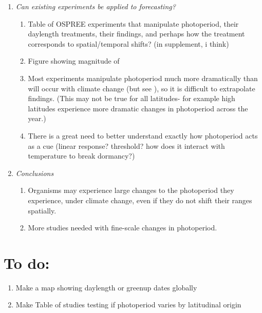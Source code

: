 \documentclass{article}
\begin{document}
\begin{enumerate}
\begin{enumerate}
\end{enumerate}
\item\textit{Can existing experiments be applied to forecasting?}
\begin{enumerate}
\item Table of OSPREE experiments that manipulate photoperiod, their daylength treatments, their findings, and perhaps how the treatment corresponds to spatial/temporal shifts? (in supplement, i think)
\item Figure showing magnitude of
\item Most experiments manipulate photoperiod much more dramatically than will occur with climate change (but see \citep{basler2012}), so it is difficult to extrapolate findings. (This may not be true for all latitudes- for example high latitudes experience more dramatic changes in photoperiod across the year.)
\item There is a great need to better understand exactly how photoperiod acts as a cue (linear response? threshold? how does it interact with temperature to break dormancy?)
\end{enumerate}
\item\textit{Conclusions}
\begin{enumerate}
\item Organisms may experience large changes to the photoperiod they experience, under climate change, even if they do not shift their ranges spatially.
\item More studies needed with fine-scale changes in photoperiod.
\end{enumerate}
\end{enumerate}

\section* {To do:}
\begin{enumerate}
\item Make a map showing daylength or greenup dates globally 
\item Make Table of studies testing if photoperiod varies by latitudinal origin
\end{enumerate}

\clearpage
\end{document}
